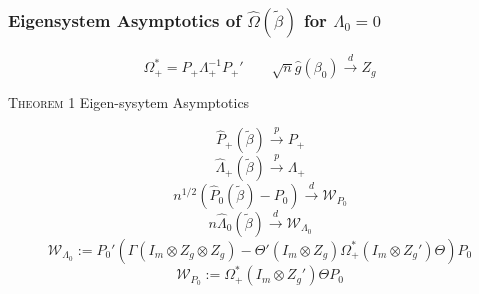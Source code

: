\documentclass{beamer}
\begin{document}
\begin{frame}
\frametitle{Eigensystem Asymptotics of $\hat{\Omega}(\tilde{\beta})$ for $\Lambda_0=0$}
\begin{equation*} \Omega_+^*=P_+\Lambda_+^{-1}P_+' \qquad \sqrt{n}\hat{g}(\beta_0)\overset{d}{\rightarrow} Z_g \end{equation*}


\textsc{Theorem 1} Eigen-sysytem Asymptotics

\begin{equation}\label{poseigvec}  \hspace{1pt} \hat{P}_{+}(\tilde{\beta})\overset{p}{\rightarrow}P_{+} \end{equation}
\begin{equation} \label{poseigval} \hspace{1pt} \hat{\Lambda}_{+}(\tilde{\beta})\overset{p}{\rightarrow}\Lambda_+\end{equation}
\begin{equation}\label{negeigvec} \hspace{1pt}  n^{1/2}(\hat{P}_{0}(\tilde{\beta})-P_0)\overset{d}{\rightarrow}  \mathcal{W}_{P_0} \end{equation}
\begin{equation} \hspace{1pt} n\hat{\Lambda}_0(\tilde{\beta})\overset{d}{\rightarrow} \mathcal{W}_{\Lambda_0}
\end{equation}
\vspace{5pt}
\begin{equation*} \mathcal{W}_{\Lambda_0}:=P_0' \left(\Gamma(I_m\otimes Z_g\otimes Z_g)- \Theta'(I_m \otimes Z_{g})\Omega_+^*(I_{m}\otimes Z_{g}')\Theta\right)
 P_0
\end{equation*}
\vspace{5pt}
\begin{equation*} \mathcal{W}_{P_0}:=\Omega_+^*(I_{m}\otimes Z_{g}')\Theta P_0 \end{equation*}


\end{frame}
\end{document}
